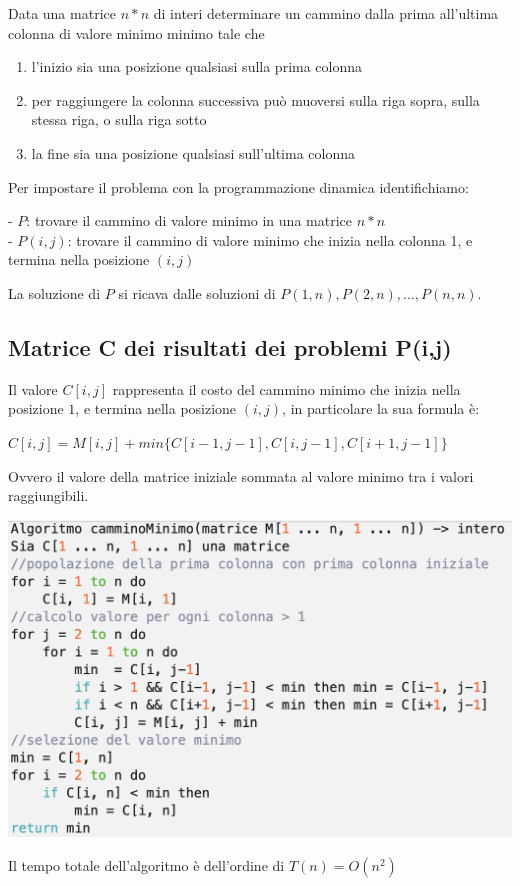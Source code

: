 \documentclass[11pt, oneside]{article}   	%
\begin{document}
\begin{itemize}
Data una matrice $n * n$ di interi determinare un cammino dalla prima all'ultima colonna di valore minimo minimo tale che \begin{enumerate}
\item l'inizio sia una posizione qualsiasi sulla prima colonna
\item per raggiungere la colonna successiva può muoversi sulla riga sopra, sulla stessa riga, o sulla riga sotto
\item la fine sia una posizione qualsiasi sull'ultima colonna
\end{enumerate}
Per impostare il problema con la programmazione dinamica identifichiamo: \begin{center}
- $P$: trovare il cammino di valore minimo in una matrice $n * n$\\
- $P(i, j)$: trovare il cammino di valore minimo che inizia nella colonna 1, e termina nella posizione $(i,j)$
\end{center}
La soluzione di $P$ si ricava dalle soluzioni di $P(1,n), P(2,n), ..., P(n,n)$. 
\subsection*{Matrice C dei risultati dei problemi P(i,j)}
Il valore $C[i,j]$ rappresenta il costo del cammino minimo che inizia nella posizione $1$, e termina nella posizione $(i,j)$, in particolare la sua formula è:
\begin{center}
$C[i,j] = M[i,j] + min\{C[i-1, j-1], C[i,j-1], C[i+1,j-1]\}$
\end{center}
Ovvero il valore della matrice iniziale sommata al valore minimo tra i valori raggiungibili.
\begin{center}
\includegraphics[scale=0.8]{cammmin}
\end{center}
Il tempo totale dell'algoritmo è dell'ordine di $T(n) = O(n^2)$
\end{itemize}
\end{document}
